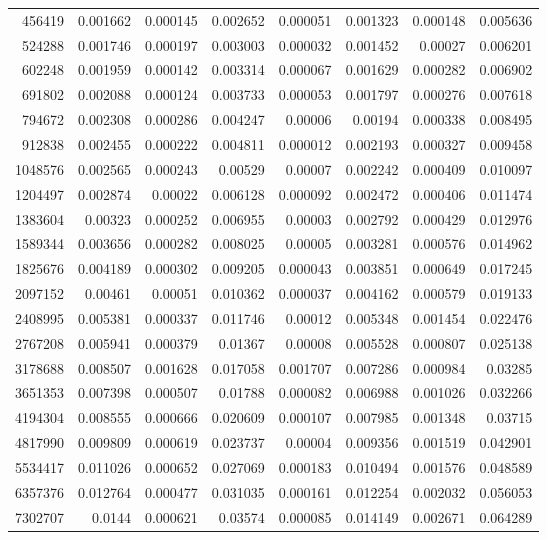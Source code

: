 \begin{longtable}{r r r r r r r r}
456419 & 0.001662 & 0.000145 & 0.002652 & 0.000051 & 0.001323 & 0.000148 & 0.005636 \\
524288 & 0.001746 & 0.000197 & 0.003003 & 0.000032 & 0.001452 & 0.00027 & 0.006201 \\
602248 & 0.001959 & 0.000142 & 0.003314 & 0.000067 & 0.001629 & 0.000282 & 0.006902 \\
691802 & 0.002088 & 0.000124 & 0.003733 & 0.000053 & 0.001797 & 0.000276 & 0.007618 \\
794672 & 0.002308 & 0.000286 & 0.004247 & 0.00006 & 0.00194 & 0.000338 & 0.008495 \\
912838 & 0.002455 & 0.000222 & 0.004811 & 0.000012 & 0.002193 & 0.000327 & 0.009458 \\
1048576 & 0.002565 & 0.000243 & 0.00529 & 0.00007 & 0.002242 & 0.000409 & 0.010097 \\
1204497 & 0.002874 & 0.00022 & 0.006128 & 0.000092 & 0.002472 & 0.000406 & 0.011474 \\
1383604 & 0.00323 & 0.000252 & 0.006955 & 0.00003 & 0.002792 & 0.000429 & 0.012976 \\
1589344 & 0.003656 & 0.000282 & 0.008025 & 0.00005 & 0.003281 & 0.000576 & 0.014962 \\
1825676 & 0.004189 & 0.000302 & 0.009205 & 0.000043 & 0.003851 & 0.000649 & 0.017245 \\
2097152 & 0.00461 & 0.00051 & 0.010362 & 0.000037 & 0.004162 & 0.000579 & 0.019133 \\
2408995 & 0.005381 & 0.000337 & 0.011746 & 0.00012 & 0.005348 & 0.001454 & 0.022476 \\
2767208 & 0.005941 & 0.000379 & 0.01367 & 0.00008 & 0.005528 & 0.000807 & 0.025138 \\
3178688 & 0.008507 & 0.001628 & 0.017058 & 0.001707 & 0.007286 & 0.000984 & 0.03285 \\
3651353 & 0.007398 & 0.000507 & 0.01788 & 0.000082 & 0.006988 & 0.001026 & 0.032266 \\
4194304 & 0.008555 & 0.000666 & 0.020609 & 0.000107 & 0.007985 & 0.001348 & 0.03715 \\
4817990 & 0.009809 & 0.000619 & 0.023737 & 0.00004 & 0.009356 & 0.001519 & 0.042901 \\
5534417 & 0.011026 & 0.000652 & 0.027069 & 0.000183 & 0.010494 & 0.001576 & 0.048589 \\
6357376 & 0.012764 & 0.000477 & 0.031035 & 0.000161 & 0.012254 & 0.002032 & 0.056053 \\
7302707 & 0.0144 & 0.000621 & 0.03574 & 0.000085 & 0.014149 & 0.002671 & 0.064289 \\

\end{longtable}
